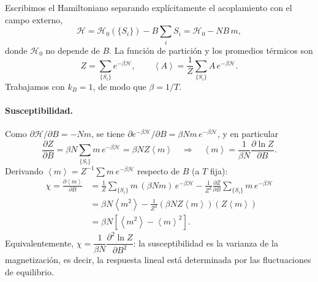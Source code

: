 \documentclass[a4paper,11pt]{article}
\newcommand{\expval}[1]{\left\langle #1 \right\rangle}
\begin{document}
Escribimos el Hamiltoniano separando explícitamente el acoplamiento con el campo externo,
\begin{equation*}
    \mathcal{H} = \mathcal{H}_0(\{S_i\}) - B\sum_i S_i = \mathcal{H}_0 - N B\, m ,
\end{equation*}
donde $\mathcal{H}_0$ no depende de $B$. La función de partición y los promedios térmicos son
\begin{equation*}
    Z = \sum_{\{S_i\}} e^{-\beta \mathcal{H}}, \qquad
    \expval{A} = \frac{1}{Z}\sum_{\{S_i\}} A\, e^{-\beta \mathcal{H}} .
\end{equation*}
Trabajamos con $k_B = 1$, de modo que $\beta = 1/T$.

\paragraph{Susceptibilidad.}
Como $\partial \mathcal{H}/\partial B = -N m$, se tiene $\partial e^{-\beta\mathcal{H}}/\partial B = \beta N m\, e^{-\beta\mathcal{H}}$, y en particular
\begin{equation*}
    \frac{\partial Z}{\partial B} = \beta N \sum_{\{S_i\}} m\, e^{-\beta\mathcal{H}} = \beta N Z \expval{m}
    \quad\Longrightarrow\quad
    \expval{m} = \frac{1}{\beta N}\frac{\partial \ln Z}{\partial B}.
\end{equation*}
Derivando $\expval{m} = Z^{-1}\sum m\, e^{-\beta\mathcal{H}}$ respecto de $B$ (a $T$ fija):
\begin{align*}
    \chi = \frac{\partial \expval{m}}{\partial B}
    &= \frac{1}{Z}\sum_{\{S_i\}} m\,(\beta N m)\, e^{-\beta\mathcal{H}}
       - \frac{1}{Z^2}\frac{\partial Z}{\partial B}\sum_{\{S_i\}} m\, e^{-\beta\mathcal{H}} \\
    &= \beta N \expval{m^2} - \frac{1}{Z^2}\left(\beta N Z\expval{m}\right)\left(Z\expval{m}\right) \\
    &= \beta N \left[ \expval{m^2} - \expval{m}^2 \right].
\end{align*}
Equivalentemente, $\chi = \dfrac{1}{\beta N}\dfrac{\partial^2 \ln Z}{\partial B^2}$: la susceptibilidad es la varianza de la magnetización, es decir, la respuesta lineal está determinada por las fluctuaciones de equilibrio.
\end{document}
